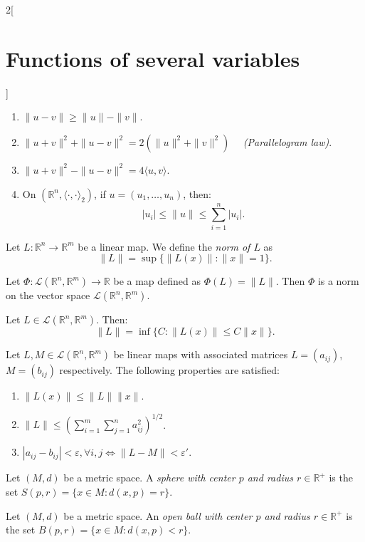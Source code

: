 \documentclass[../../../main.tex]{subfiles}
\begin{document}
\begin{multicols}{2}[\section{Functions of several variables}]
\begin{prop}
\begin{enumerate}
    \item $\|u-v\|\geq\|u\|-\|v\|$.
    \item $\|u+v\|^2+\|u-v\|^2=2(\|u\|^2+\|v\|^2)\quad$ \textit{(Parallelogram law)}.
    \item $\|u+v\|^2-\|u-v\|^2=4\langle u,v\rangle$.
    \item On $(\mathbb{R}^n,\langle\cdot,\cdot\rangle_2)$, if $u=(u_1,\ldots,u_n)$, then: $$|u_i|\leq\|u\|\leq\sum_{i=1}^n|u_i|.$$
\end{enumerate}
\end{prop}
\begin{definition}
Let $L:\mathbb{R}^n\rightarrow\mathbb{R}^m$ be a linear map. We define the \textit{norm of $L$} as $$\|L\|=\sup\{\|L(x)\|:\|x\|=1\}.$$
\end{definition}
\begin{lemma}
Let $\Phi:\mathcal{L}(\mathbb{R}^n,\mathbb{R}^m)\rightarrow\mathbb{R}$ be a map defined as $\Phi(L)=\|L\|$. Then $\Phi$ is a norm on the vector space $\mathcal{L}(\mathbb{R}^n,\mathbb{R}^m)$.
\end{lemma}
\begin{prop}
Let $L\in\mathcal{L}(\mathbb{R}^n,\mathbb{R}^m)$. Then: $$\|L\|=\inf\{C:\|L(x)\|\leq C\|x\|\}.$$
\end{prop}
\begin{corollary}
Let $L,M\in\mathcal{L}(\mathbb{R}^n,\mathbb{R}^m)$ be linear maps with associated matrices $L=(a_{ij})$, $M=(b_{ij})$ respectively. The following properties are satisfied:
\begin{enumerate}
    \item $\|L(x)\|\leq\|L\|\|x\|$.
    \item $\displaystyle\|L\|\leq\left(\sum_{i=1}^m\sum_{j=1}^na_{ij}^2\right)^{1/2}$.
    \item $|a_{ij}-b_{ij}|<\varepsilon,\forall i,j\iff\|L-M\|<\varepsilon'$.
\end{enumerate}
\end{corollary}
\begin{definition}
Let $(M,d)$ be a metric space. A \textit{sphere with center $p$ and radius $r\in\mathbb{R}^+$} is the set $S(p,r)=\{x\in M:d(x,p)=r\}$.
\end{definition}
\begin{definition}
Let $(M,d)$ be a metric space. An \textit{open ball with center $p$ and radius $r\in\mathbb{R}^+$} is the set $B(p,r)=\{x\in M:d(x,p)<r\}$.
\end{definition}
\begin{definition}

\end{definition}
\end{multicols}
\end{document}
